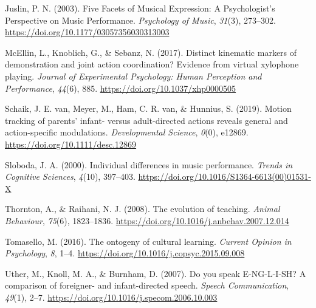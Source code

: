 \documentclass[
  english,
  man,floatsintext]{apa6}
\newlength{\cslhangindent}
\newenvironment{cslreferences}%
  {\setlength{\parindent}{0pt}%
  \everypar{\setlength{\hangindent}{\cslhangindent}}\ignorespaces}%
  {\par}
\begin{document}
\begin{cslreferences}
\leavevmode\hypertarget{ref-juslin_2003}{}%
Juslin, P. N. (2003). Five Facets of Musical Expression: A Psychologist's Perspective on Music Performance. \emph{Psychology of Music}, \emph{31}(3), 273--302. \url{https://doi.org/10.1177/03057356030313003}

\leavevmode\hypertarget{ref-mcellin_2017}{}%
McEllin, L., Knoblich, G., \& Sebanz, N. (2017). Distinct kinematic markers of demonstration and joint action coordination? Evidence from virtual xylophone playing. \emph{Journal of Experimental Psychology: Human Perception and Performance}, \emph{44}(6), 885. \url{https://doi.org/10.1037/xhp0000505}

\leavevmode\hypertarget{ref-schaik_2019}{}%
Schaik, J. E. van, Meyer, M., Ham, C. R. van, \& Hunnius, S. (2019). Motion tracking of parents' infant- versus adult-directed actions reveals general and action-specific modulations. \emph{Developmental Science}, \emph{0}(0), e12869. \url{https://doi.org/10.1111/desc.12869}

\leavevmode\hypertarget{ref-sloboda_2000}{}%
Sloboda, J. A. (2000). Individual differences in music performance. \emph{Trends in Cognitive Sciences}, \emph{4}(10), 397--403. \url{https://doi.org/10.1016/S1364-6613(00)01531-X}

\leavevmode\hypertarget{ref-thornton_2008}{}%
Thornton, A., \& Raihani, N. J. (2008). The evolution of teaching. \emph{Animal Behaviour}, \emph{75}(6), 1823--1836. \url{https://doi.org/10.1016/j.anbehav.2007.12.014}

\leavevmode\hypertarget{ref-tomasello_2016}{}%
Tomasello, M. (2016). The ontogeny of cultural learning. \emph{Current Opinion in Psychology}, \emph{8}, 1--4. \url{https://doi.org/10.1016/j.copsyc.2015.09.008}

\leavevmode\hypertarget{ref-uther_2007}{}%
Uther, M., Knoll, M. A., \& Burnham, D. (2007). Do you speak E-NG-L-I-SH? A comparison of foreigner- and infant-directed speech. \emph{Speech Communication}, \emph{49}(1), 2--7. \url{https://doi.org/10.1016/j.specom.2006.10.003}
\end{cslreferences}

\endgroup
\raggedbottom
\end{document}
